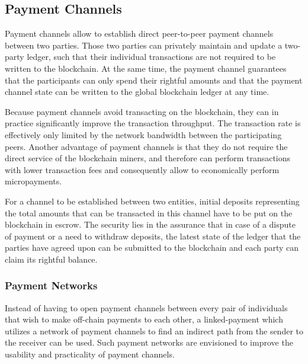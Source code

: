 \documentclass[sigconf]{acmart}
\begin{document}
\subsection{Payment Channels}
Payment channels allow to establish direct peer-to-peer payment channels between two parties. Those two parties can privately maintain and update a two-party ledger, such that their individual transactions are not required to be written to the blockchain. At the same time, the payment channel guarantees that the participants can only spend their rightful amounts and that the payment channel state can be written to the global blockchain ledger at any time.

Because payment channels avoid transacting on the blockchain, they can in practice significantly improve the transaction throughput. The transaction rate is effectively only limited by the network bandwidth between the participating peers. Another advantage of payment channels is that they do not require the direct service of the blockchain miners, and therefore can perform transactions with lower transaction fees and consequently allow to economically perform micropayments.

For a channel to be established between two entities, initial deposits representing the total amounts that can be transacted in this channel have to be put on the blockchain in escrow. The security lies in the assurance that in case of a dispute of payment or a need to withdraw deposits, the latest state of the ledger that the parties have agreed upon can be submitted to the blockchain and each party can claim its rightful balance.


\subsubsection{Payment Networks}
Instead of having to open payment channels between every pair of individuals that wish to make off-chain payments to each other, a linked-payment which utilizes a network of payment channels to find an indirect path from the sender to the receiver can be used. Such payment networks are envisioned to improve the usability and practicality of payment channels.
\end{document}
